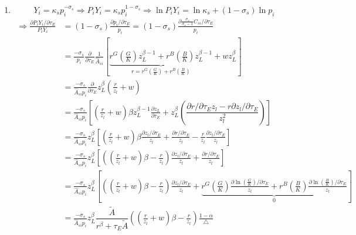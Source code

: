 \documentclass[12pt]{article} %
\begin{document}
\begin{enumerate}
    \item 
    \begin{equation*}
        Y_i = \kappa_s p_i^{-\sigma_s} \Rightarrow P_iY_i = \kappa_s p_i^{1-\sigma_s} \Rightarrow \ln P_iY_i = \ln \kappa_s + (1-\sigma_s) \ln p_i
    \end{equation*}
        \begin{align*}
            \Rightarrow  \frac{\partial P_iY_i/\partial\tau_E}{P_iY_i} & = (1-\sigma_s) \frac{\partial p_i/\partial\tau_E}{p_i}   = (1-\sigma_s) \frac{\partial \frac{\sigma_s}{\sigma_s - 1} C_{si}/\partial\tau_E}{p_i}\\
             & =  \frac{- \sigma_s}{p_i} \frac{\partial }{\partial\tau_E} \frac{1}{\hat{A}_{si}} \left[
                    \underbrace{r^G (\frac{G}{K}) z_L^{\beta-1} 
                    + r^B (\frac{B}{K}) z_L^{\beta-1}}_{r = r^G (\frac{G}{K}) + r^B (\frac{B}{K})}
                    + w z_L^{\beta}
                   \right]\\
                & = \frac{- \sigma_s}{\hat{A}_{si}p_i} \frac{\partial }{\partial\tau_E} z_L^{\beta}(
                    \frac{r}{z_l} + w
                )\\
                & = \frac{- \sigma_s}{\hat{A}_{si}p_i} \left[
                    (\frac{r}{z_l} + w)\beta z_L^{\beta-1} \frac{\partial z_L}{\partial \tau_E} + z_L^{\beta}(
                        \dfrac{\partial r / \partial \tau_E z_l - r\partial z_l / \partial \tau_E}{z_l^2}
                    )
                \right]\\
                & = \frac{- \sigma_s}{\hat{A}_{si}p_i} z_L^{\beta} \left[
                    (\frac{r}{z_l} + w)\beta\frac{ \partial z_l / \partial \tau_E}{z_l} 
                    + \frac{\partial r / \partial \tau_E}{z_l} 
                    -\frac{r}{z_l} \frac{ \partial z_l / \partial \tau_E}{z_l}
                \right]\\
                & = \frac{- \sigma_s}{\hat{A}_{si}p_i} z_L^{\beta} \left[
                    ((\frac{r}{z_l} + w)\beta-\frac{r}{z_l} )\frac{ \partial z_l / \partial \tau_E}{z_l} 
                    + \frac{\partial r / \partial \tau_E}{z_l}
                \right]  \\
                & =  \frac{- \sigma_s}{\hat{A}_{si}p_i} z_L^{\beta} \left[
                    ((\frac{r}{z_l} + w)\beta-\frac{r}{z_l} )\frac{ \partial z_l / \partial \tau_E}{z_l} 
                    + \underbrace{r^G (\frac{G}{K})\frac{ \partial \ln (\frac{G}{K}) / \partial \tau_E}{z_l}
                    + r^B (\frac{B}{K})\frac{ \partial \ln (\frac{B}{K}) / \partial \tau_E}{z_l}}_{0}
                \right]\\
                &= \frac{- \sigma_s}{\hat{A}_{si}p_i} z_L^{\beta}\dfrac{\tilde{A}}{r^\beta+\tau_E \tilde{A}}
                ((\frac{r}{z_l} + w)\beta-\frac{r}{z_l} )\frac{1-\alpha}{\triangle}
        \end{align*}
       

\end{enumerate}
\end{document}
